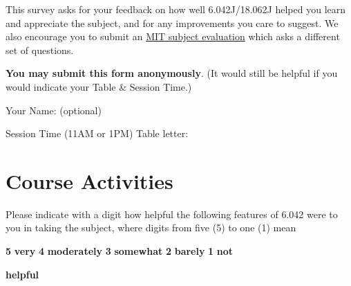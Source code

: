 \documentclass[handout]{mcs}
\begin{document}

This survey asks for your feedback on how well 6.042J/18.062J helped
you learn and appreciate the subject, and \iffalse .  Comparing
student self-assessments given in this survey to student grades helps
us determine how to improve the course.  We would also be grateful\fi
for any improvements you care to suggest.  We also encourage you to
submit an
\href{http://web.mit.edu/subjectevaluation/evaluate.html}{MIT subject
  evaluation} which asks a different set of questions.

\textbf{You may submit this form anonymously}.  (It would still be
helpful if you would indicate your Table \& Session Time.)

\large{Your Name: (optional)} \brule{3in}

Session Time (11AM or 1PM)\brule{0.5in}    Table letter: \brule{0.5in}

\section*{Course Activities}

Please indicate with a digit how helpful the following features of
6.042 were to you in taking the subject, where digits from five (5) to
one (1) mean
\begin{center}
\textbf{5}  \textbf{very} \qquad
\textbf{4}  \textbf{moderately}\qquad
\textbf{3} \textbf{somewhat}\qquad
\textbf{2} \textbf{barely}\qquad
\textbf{1} \textbf{not}

  \textbf{helpful}
\end{center}

\iffalse
 How helpful have the following aspects of the course been in
achieving the subject outcomes for you personally:
\fi
\end{document}
